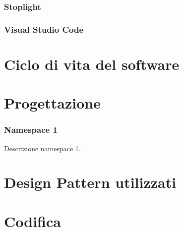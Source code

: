 \subsubsection{Stoplight}

\subsubsection{Visual Studio Code}

\section{Ciclo di vita del software}
\label{sec:ciclo-vita-software}

\section{Progettazione}
\label{sec:progettazione}

\subsubsection{Namespace 1} %
Descrizione namespace 1.

\begin{namespacedesc}
\end{namespacedesc}


\section{Design Pattern utilizzati}

\section{Codifica}
